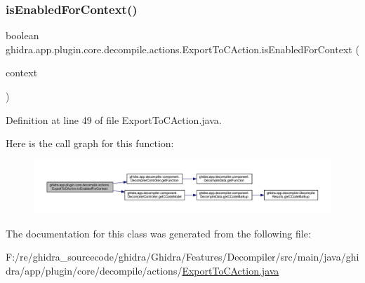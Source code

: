 \subsubsection{\texorpdfstring{isEnabledForContext()}{isEnabledForContext()}}
{\footnotesize\ttfamily boolean ghidra.\+app.\+plugin.\+core.\+decompile.\+actions.\+Export\+To\+C\+Action.\+is\+Enabled\+For\+Context (\begin{DoxyParamCaption}\item[{Action\+Context}]{context }\end{DoxyParamCaption})\hspace{0.3cm}{\ttfamily [inline]}}



Definition at line 49 of file Export\+To\+C\+Action.\+java.

Here is the call graph for this function\+:
\nopagebreak
\begin{figure}[H]
\begin{center}
\leavevmode
\includegraphics[width=350pt]{classghidra_1_1app_1_1plugin_1_1core_1_1decompile_1_1actions_1_1_export_to_c_action_a2d7a70335828c99d7c84302bfe504465_cgraph}
\end{center}
\end{figure}


The documentation for this class was generated from the following file\+:\begin{DoxyCompactItemize}
\item 
F\+:/re/ghidra\+\_\+sourcecode/ghidra/\+Ghidra/\+Features/\+Decompiler/src/main/java/ghidra/app/plugin/core/decompile/actions/\mbox{\hyperlink{_export_to_c_action_8java}{Export\+To\+C\+Action.\+java}}\end{DoxyCompactItemize}
